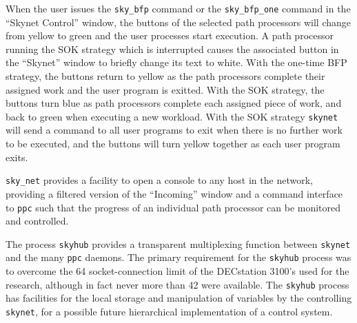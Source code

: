 When the user issues the \texttt{sky\_{}bfp} command or the \texttt{sky\_{}bfp\_{}one}
command in the ``Skynet Control'' window, the buttons of the selected path
processors will change from yellow to green and the user processes start
execution.  A path processor running the SOK strategy which is interrupted
causes the associated button in the ``Skynet'' window to briefly change its text to white.
With the one-time BFP strategy, the buttons return to yellow as the path processors complete their
assigned work and the user program is exitted.  With the SOK strategy, the buttons turn blue
as path processors complete each assigned piece of work, and back to green when executing
a new workload.  With the SOK strategy \texttt{skynet} will send a command to all user programs
to exit when there is no further work to be executed, and the buttons will turn yellow together as
each user program exits.

\texttt{sky\_{}net} provides a facility to open a console to any host in the network, providing
a filtered version of the ``Incoming'' window and a command interface to \texttt{ppc} such
that the progress of an individual path processor can be monitored and controlled.

The process \texttt{skyhub} provides a transparent multiplexing function between
\texttt{skynet} and the many \texttt{ppc} daemons.  The primary requirement for
the \texttt{skyhub} process was to overcome the 64 socket-connection limit of
the DECstation 3100's used for the research, although in fact never more than
42 were available.  The \texttt{skyhub} process has facilities for the local
storage and manipulation of variables by the controlling \texttt{skynet}, for
a possible future hierarchical implementation of a control system.

